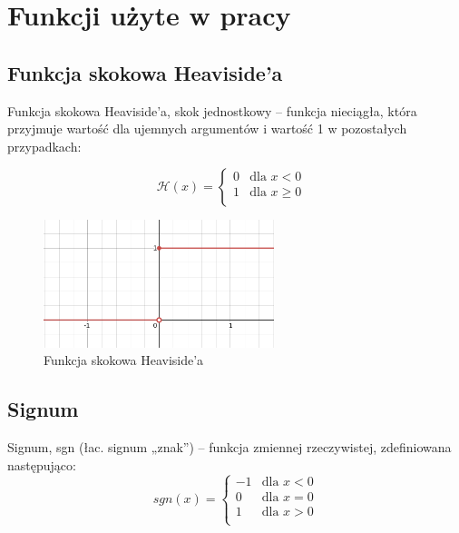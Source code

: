 \documentclass{article}
\begin{document}
\section{Funkcji użyte w pracy}

\subsection{Funkcja skokowa Heaviside’a}
Funkcja skokowa Heaviside’a, skok jednostkowy – funkcja nieciągła, która przyjmuje wartość dla ujemnych argumentów i wartość 1 w pozostałych przypadkach:

\begin{equation}
	\mathcal{H}(x) = 
	\begin{cases}
		0 & \text{dla $x < 0$}\\
		1 & \text{dla $x \geqslant 0$ }\\
	\end{cases}    
\end{equation}

\begin{figure}[H]
	\centering
	\includegraphics[width=0.6\textwidth,keepaspectratio=true]{Heaviside}
	\caption{
		Funkcja skokowa Heaviside’a
	}
	\label{Heaviside}
\end{figure}


\subsection{Signum}
Signum, sgn (łac. signum „znak”) – funkcja zmiennej rzeczywistej, zdefiniowana następująco:
\begin{equation}
	sgn(x) = 
	\begin{cases}
		-1 & \text{dla $x < 0$}\\
		0 & \text{dla $x = 0$}\\
		1 & \text{dla $x > 0$}\\
	\end{cases}    
\end{equation}
\end{document}
